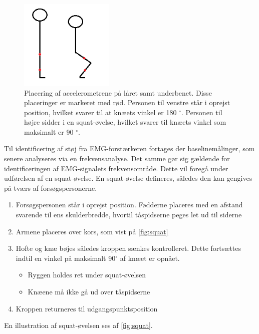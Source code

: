 \begin{figure}[H]
\centering
\includegraphics[width=0.4\textwidth]{figures/accelerometervinkel.png}
\caption{Placering af accelerometrene på låret samt underbenet. Disse placeringer er markeret med rød. Personen til venstre står i oprejst position, hvilket svarer til at knæets vinkel er 180 $^{\circ}$. Personen til højre sidder i en squat-øvelse, hvilket svarer til knæets vinkel som maksimalt er 90 $^{\circ}$.}
\label{fig:accelerometervinkel}
\end{figure}

Til identificering af støj fra EMG-forstærkeren fortages der baselinemålinger, som senere analyseres via en frekvensanalyse. Det samme gør sig gældende for identificeringen af EMG-signalets frekvensområde. Dette vil foregå under udførelsen af en squat-øvelse.
En squat-øvelse defineres, således den kan gengives på tværs af forsøgspersonerne.\vspace{3mm}
\begin{enumerate}
\item Forsøgspersonen står i oprejst position. Fødderne placeres med en afstand svarende til ens skulderbredde, hvortil tåspidserne peges let ud til siderne
\item Armene placeres over kors, som vist på \autoref{fig:squat}
\item Hofte og knæ bøjes således kroppen sænkes kontrolleret. Dette fortsættes indtil en vinkel på maksimalt 90$^{\circ}$ af knæet er opnået.
	\begin{itemize}
	\item Ryggen holdes ret under squat-øvelsen 
	\item Knæene må ikke gå ud over tåspidserne 
	\end{itemize}
\item Kroppen returneres til udgangspunktsposition
\end{enumerate} \vspace{3mm}
En illustration af squat-øvelsen ses af \autoref{fig:squat}.

